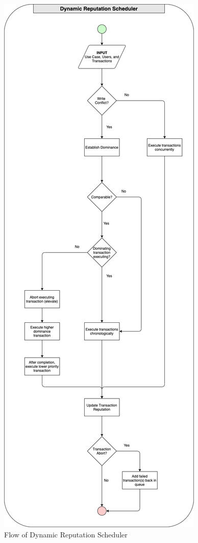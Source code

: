 \begin{figure}
\centering
\includegraphics[scale=0.28]{images/DRPScheduler.png}
\caption{Flow of Dynamic Reputation Scheduler}
\label{image:flow_of_drs}
\end{figure}

